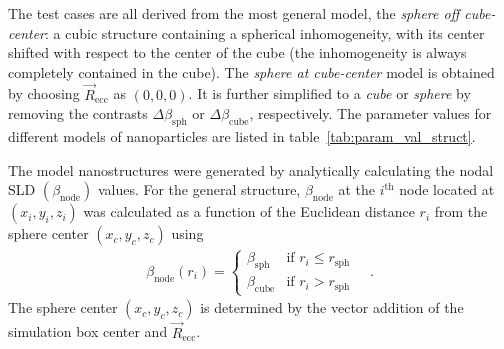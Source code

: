 \documentclass[preprint, 5p, times, twocolumn]{elsarticle}
\begin{document}
The test cases are all derived from the most general model, the \emph{sphere off cube-center}: a cubic structure containing a spherical inhomogeneity, with its center shifted with respect to the center of the cube (the inhomogeneity is always completely contained in the cube). The \emph{sphere at cube-center} model is obtained by choosing $\vec{R}_{\text{ecc}}$ as $(0,0,0)$. It is further simplified to a \emph{cube} or \emph{sphere} by removing the contrasts $\Delta\beta_{\text{sph}}$ or $\Delta\beta_{\text{cube}}$, respectively. The parameter values for different models of nanoparticles are listed in table~\ref{tab:param_val_struct}.

The model nanostructures were generated by analytically calculating the nodal SLD $(\beta_{\text{node}})$ values. For the general structure, $\beta_{\text{node}}$ at the $i^{\text{th}}$ node located at $(x_i, y_i, z_i)$ was calculated as a function of the Euclidean distance $r_i$ from the sphere center $(x_c, y_c, z_c)$ using
%
\begin{equation}
\label{eqn:SLD_sph}
\begin{aligned}
    \beta_{\text{node}}(r_i) = 
    \begin{cases}
    \beta_{\text{sph}} & \text{if } r_i \leq r_{\text{sph}} \\
    \beta_{\text{cube}} & \text{if } r_i > r_{\text{sph}}
    \end{cases}\quad.
\end{aligned}
\end{equation}
%
The sphere center $(x_c, y_c, z_c)$ is determined by the vector addition of the simulation box center and $\vec{R}_{\text{ecc}}$.
\end{document}
